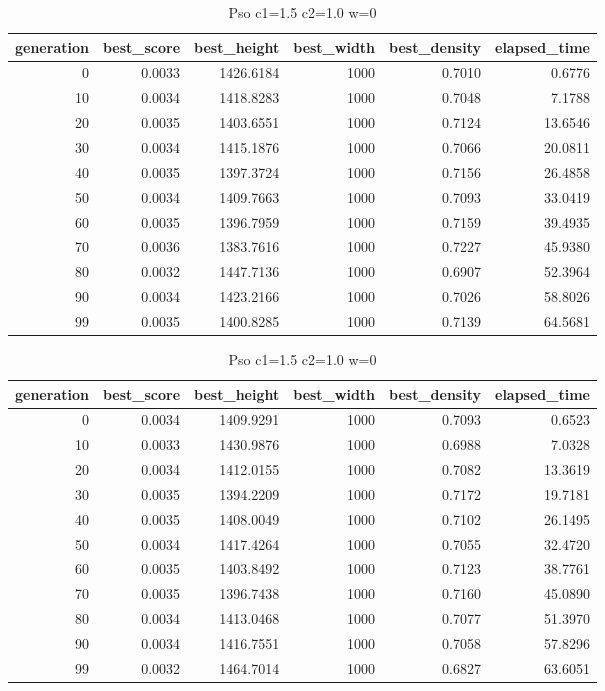 \begin{table}[htbp]
    \centering
    \caption{Pso c1=1.5 c2=1.0 w=0}
    \label{tab:pso_c1_1_5_c2_1_0_w_0}
    \begin{tabular}{rrrrrr}
    \toprule
    generation & best_score & best_height & best_width & best_density & elapsed_time \\
    \midrule
    0 & 0.0033 & 1426.6184 & 1000 & 0.7010 & 0.6776 \\
    10 & 0.0034 & 1418.8283 & 1000 & 0.7048 & 7.1788 \\
    20 & 0.0035 & 1403.6551 & 1000 & 0.7124 & 13.6546 \\
    30 & 0.0034 & 1415.1876 & 1000 & 0.7066 & 20.0811 \\
    40 & 0.0035 & 1397.3724 & 1000 & 0.7156 & 26.4858 \\
    50 & 0.0034 & 1409.7663 & 1000 & 0.7093 & 33.0419 \\
    60 & 0.0035 & 1396.7959 & 1000 & 0.7159 & 39.4935 \\
    70 & 0.0036 & 1383.7616 & 1000 & 0.7227 & 45.9380 \\
    80 & 0.0032 & 1447.7136 & 1000 & 0.6907 & 52.3964 \\
    90 & 0.0034 & 1423.2166 & 1000 & 0.7026 & 58.8026 \\
    99 & 0.0035 & 1400.8285 & 1000 & 0.7139 & 64.5681 \\
    \bottomrule
    \end{tabular}
\end{table}


\begin{table}[htbp]
    \centering
    \caption{Pso c1=1.5 c2=1.0 w=0}
    \label{tab:pso_c1_1_5_c2_1_0_w_0}
    \begin{tabular}{rrrrrr}
    \toprule
    generation & best_score & best_height & best_width & best_density & elapsed_time \\
    \midrule
    0 & 0.0034 & 1409.9291 & 1000 & 0.7093 & 0.6523 \\
    10 & 0.0033 & 1430.9876 & 1000 & 0.6988 & 7.0328 \\
    20 & 0.0034 & 1412.0155 & 1000 & 0.7082 & 13.3619 \\
    30 & 0.0035 & 1394.2209 & 1000 & 0.7172 & 19.7181 \\
    40 & 0.0035 & 1408.0049 & 1000 & 0.7102 & 26.1495 \\
    50 & 0.0034 & 1417.4264 & 1000 & 0.7055 & 32.4720 \\
    60 & 0.0035 & 1403.8492 & 1000 & 0.7123 & 38.7761 \\
    70 & 0.0035 & 1396.7438 & 1000 & 0.7160 & 45.0890 \\
    80 & 0.0034 & 1413.0468 & 1000 & 0.7077 & 51.3970 \\
    90 & 0.0034 & 1416.7551 & 1000 & 0.7058 & 57.8296 \\
    99 & 0.0032 & 1464.7014 & 1000 & 0.6827 & 63.6051 \\
    \bottomrule
    \end{tabular}
\end{table}


